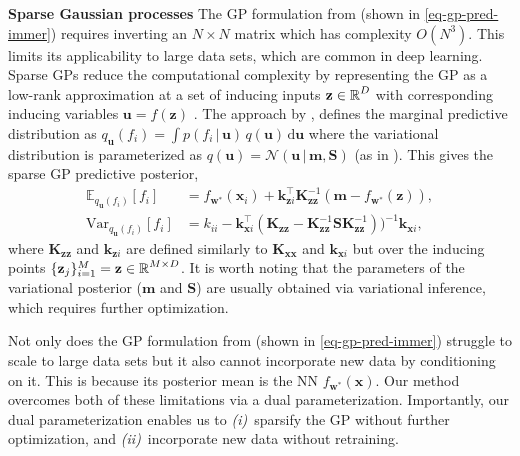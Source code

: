\documentclass{article}
\newcommand{\dataset}{\ensuremath{\mathcal{D}}}
\newcommand{\mbf}[1]{\mathbf{#1}}
\renewcommand{\mid}{\,|\,}
\newcommand{\MS}{\mbf{S}}
\newcommand{\vm}{\mbf{m}}
\newcommand{\vz}{\mbf{z}}
\newcommand{\vu}{\mbf{u}}
\newcommand{\vx}{\mbf{x}}
\newcommand{\vw}{\mbf{w}}
\newcommand{\MKzz}{\mbf{K}_{\mbf{z}\mbf{z}}}
\newcommand{\MKxx}{\mbf{K}_{\mbf{x}\mbf{x}}}
\newcommand{\vkzs}{\mbf{k}_{\mbf{z}i}}
\newcommand{\vk}{\mbf{k}}
\newcommand{\myexpect}{\mathbb{E}}
\begin{document}
\textbf{Sparse Gaussian processes}
The GP formulation from \citet{immer2021improving} (shown in \cref{eq-gp-pred-immer})
requires inverting an $N\times N$ matrix which has complexity $O(N^3)$.
This limits its applicability to large data sets, which are common in deep learning.
Sparse GPs reduce the computational complexity by representing the GP as a low-rank approximation at a set of inducing
inputs $\vz \in \R^{D}$ with corresponding inducing variables $\vu = f(\vz)$ \citep[see][for an early overview]{quinonero2005unifying}.
The approach by \citet{titsias2009variational} \citep[also used in the DTC approximation, see][]{quinonero2005unifying},
defines the marginal predictive distribution as $q_{\vu}(f_i)  = \int p(f_i  \mid \vu) \, q(\vu) \, \mathrm{d}\vu$ where
the variational distribution is parameterized as $q(\vu) = \mathcal{N}\left(\vu \mid \vm, \MS \right)$ (as in \citet{titsias2009variational,hensman2013gaussian}).
This gives the sparse GP predictive posterior,
\begin{subequations}  \label{eq-svgp-pred}
\begin{align}
  \myexpect_{q_{\vu}(f_i)}[f_i] &= f_{\vw^{*}}(\vx_{i}) + \vk_{\vz i}^{\top}\MKzz^{-1}(\vm - f_{\vw^{*}}(\vz)), \\
  \mathrm{Var}_{q_{\vu}(f_i)}[f_i] &= k_{ii} - \vk_{\vx i}^\top ( \MKzz -  \MKzz^{-1}\MS  \MKzz^{-1}))^{-1} \vk_{\vx i},  \nonumber
\end{align}
\end{subequations}
where $\MKzz$ and $\vkzs$ are defined similarly to $\MKxx$ and $\vk_{\vx i}$ but over the inducing points $\{\vz_j\}_{i=1}^M=\vz \in \R^{M \times D}$.%
It is worth noting that the parameters of the variational posterior ($\vm$ and $\MS$) are usually obtained via variational
inference, which requires further optimization.%

Not only does the GP formulation from \citet{immer2021improving} (shown in \cref{eq-gp-pred-immer}) struggle to scale to large
data sets but it also cannot incorporate new data by conditioning on it.
This is because its posterior mean is the NN  $f_{\vw^*}(\vx)$.
Our method overcomes both of these limitations via a dual parameterization.
Importantly, our dual parameterization enables us to {\em (i)}~sparsify the GP without further optimization, and {\em (ii)}~incorporate new data without retraining. %
\end{document}
